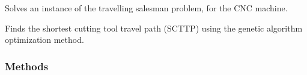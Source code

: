 \documentclass[letterpaper,10pt,english,openany,oneside]{sphinxmanual}
\begin{document}
\begin{fulllineitems}
\label{\detokenize{reference:cnc.optimization.GeneticAlgorithm}}
Solves an instance of the travelling salesman problem, for the CNC machine.

Finds the shortest cutting tool travel path (SCTTP) using the genetic
algorithm optimization method.
\subsubsection*{Methods}


\begin{savenotes}\sphinxatlongtablestart\begin{longtable}{}
\hline

\endfirsthead

%
{}\\
\hline

\endhead

\hline
{}\\
\endfoot

\endlastfoot


\end{longtable}
\end{savenotes}
\end{fulllineitems}
\end{document}
